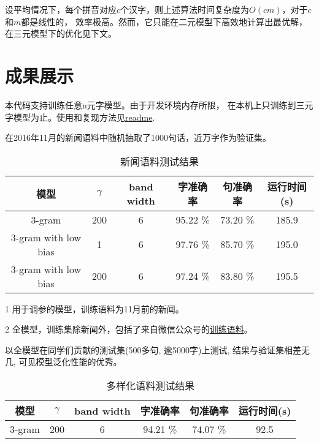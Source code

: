 \documentclass[12pt, UTF8, a4paper]{ctexart}
\begin{document}
设平均情况下，每个拼音对应$c$个汉字，则上述算法时间复杂度为$O(cm)$，对于$c$和$m$都是线性的，
效率极高。然而，它只能在二元模型下高效地计算出最优解，在三元模型下的优化见下文。

\section{成果展示}

本代码支持训练任意n元字模型。由于开发环境内存所限，
在本机上只训练到三元字模型为止。使用和复现方法见\href{../readme.md}{readme}.

在2016年11月的新闻语料中随机抽取了1000句话，近万字作为验证集。

\begin{table*}[htbp]
\centering
\begin{threeparttable}
    \caption{\label{tab:1}新闻语料测试结果} 
    \small
    \begin{tabular}{cccccc} 
     \toprule 
     模型 & $\gamma$ & band width & 字准确率& 句准确率 & 运行时间(s) \\ 
     \midrule 
    3-gram\tnote{1}  & 200   & 6    & 95.22 \%  & 73.20 \%  & 185.9\\
    3-gram with low bias\tnote{2} & 1   & 6  & 97.76 \%  & 85.70 \%  & 195.0\\
    3-gram with low bias & 200 & 6 & 97.24 \% & 83.80 \% & 195.5\\
     \bottomrule 
\end{tabular}
\begin{tablenotes}
    \footnotesize
    \item[1] 用于调参的模型，训练语料为11月前的新闻。
    \item[2] 全模型，训练集除新闻外，包括了来自微信公众号的\href{https://github.com/nonamestreet/weixin\_public\_corpus}{训练语料}。
\end{tablenotes}
\end{threeparttable}
\end{table*}

以全模型在同学们贡献的测试集(500多句, 逾5000字)上测试, 结果与验证集相差无几,
可见模型泛化性能的优秀。

\begin{table}[htbp] 
    \caption{\label{tab:2}多样化语料测试结果} 
    \centering
    \small
    \begin{tabular}{cccccc} 
     \toprule 
     模型 & $\gamma$ & band width & 字准确率& 句准确率 & 运行时间(s) \\ 
     \midrule 
     3-gram  & 200   & 6    & 94.21 \%  & 74.07 \%  & 92.5 \\
     \bottomrule 
    \end{tabular}
\end{table}
\end{document}
